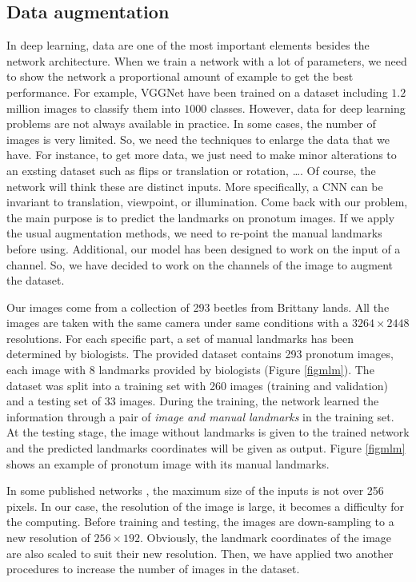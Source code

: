 \documentclass{article} %
\begin{document}
\begin{multicols}{2}
\subsection{Data augmentation}
\label{Secdataaug}
In deep learning, data are one of the most important elements besides the network architecture. When we train a network with a lot of parameters, we need to show the network a proportional amount of example to get the best performance. For example, VGGNet \cite{.} have been trained on a dataset including $1.2$ million images to classify them into $1000$ classes. However, data for deep learning problems are not always available in practice. In some cases, the number of images is very limited. So,
we need the techniques to enlarge the data that we have. For instance, to get more data, we just need to make minor alterations to an exsting dataset such as flips or translation or rotation, \ldots. Of course, the network will think these are distinct inputs. More specifically, a CNN can be invariant to translation, viewpoint, or illumination. Come back with our problem, the main purpose is to predict the landmarks on pronotum images. If we apply the usual augmentation methods, we need to re-point the manual landmarks before using. Additional, our model has been designed to work on the input of a channel. So, we have decided to work on the channels of the image to augment the dataset.

Our images come from a collection of 293 beetles from Brittany lands. All the images are taken with the same camera under same conditions with a $3264 \times 2448$ resolutions. For each specific part, a set of manual landmarks has been determined by biologists. The provided dataset contains 293 pronotum images, each image with 8 landmarks provided by biologists (Figure \ref{figmlm}). The dataset was split into a training set with 260 images (training and validation) and a testing set of 33 images. During the training, the network learned the information through a pair of \textit{image and manual landmarks} in the training set. At the testing stage, the image without landmarks is given to the trained network and the predicted landmarks coordinates will be given as output. Figure \ref{figmlm} shows an example of pronotum image with its manual landmarks.

In some published networks \cite{krizhevsky2012imagenet, sun2013deep, cintas2016automatic}, the maximum size of the inputs is not over 256 pixels. In our case, the resolution of the image is large, it becomes a difficulty for the computing. Before training and testing, the images are down-sampling to a new resolution of $256 \times 192$. Obviously, the landmark coordinates of the image are also scaled to suit their new resolution. Then, we have applied two another procedures to increase the number of images in the dataset.


\end{multicols}
\end{document}
